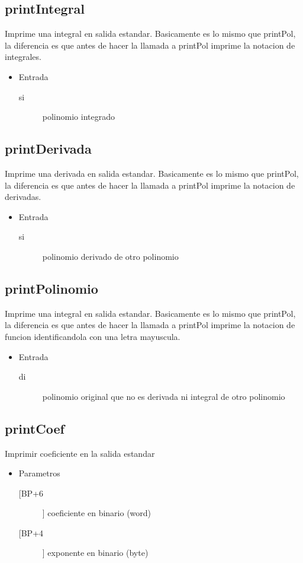 \subsection{printIntegral}
\label{sec-5-6}
Imprime una integral en salida estandar. Basicamente es lo
mismo que printPol, la diferencia es que antes de hacer la
llamada a printPol imprime la notacion de integrales.
\begin{itemize}
\item Entrada
\begin{description}
\item[si] polinomio integrado
\end{description}
\end{itemize}


\subsection{printDerivada}
\label{sec-5-7}
Imprime una derivada en salida estandar. Basicamente es lo
mismo que printPol, la diferencia es que antes de hacer la
llamada a printPol imprime la notacion de derivadas.
\begin{itemize}
\item Entrada
\begin{description}
\item[si] polinomio derivado de otro polinomio
\end{description}
\end{itemize}


\subsection{printPolinomio}
\label{sec-5-8}
Imprime una integral en salida estandar. Basicamente es lo
mismo que printPol, la diferencia es que antes de hacer la
llamada a printPol imprime la notacion de funcion
identificandola con una letra mayuscula.
\begin{itemize}
\item Entrada
\begin{description}
\item[di] polinomio original que no es derivada ni integral
de otro polinomio
\end{description}
\end{itemize}


\subsection{printCoef}
\label{sec-5-9}
Imprimir coeficiente en la salida estandar
\begin{itemize}
\item Parametros
\begin{description}
\item[[BP+6]] coeficiente en binario (word)
\item[[BP+4]] exponente en binario (byte)
\end{description}
\end{itemize}

